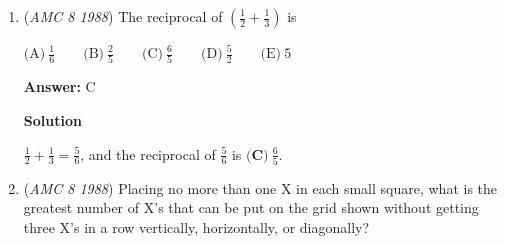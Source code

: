 \begin{enumerate}
 
 \[\begin{array}{|c|c|c|} \multicolumn{3}{}{} \\ \hline \diamondsuit & \Delta & \diamondsuit + \Delta \\ \hline 36 & 1 & 37 \\ \hline 18 & 2 & 20 \\ \hline 12 & 3 & 15 \\ \hline 9 & 4 & 13 \\ \hline 6 & 6 & 12 \\ \hline \end{array}\]

 So $\boxed{\textbf{(E)}\ 37}$ is the largest possible sum.

 



\textbf{Solution 2}

We notice that the function $f(x) = x + \frac{36}x$ is convex with a minimum at $x = 6$, so we seek to pick a value of $x$ far from 6. To ensure that the answers are positive integers, we let $x = 36$, from which we find that $f(x) = 37$, the maximum.

 -GaloisTorrent

 



\textbf{Solution 3 (Answer Choices)}

Notice that $1 \times 36 = 36$ and $1+36=37$.  Since $\boxed{\textbf{(E)}\ 37}$ is the highest answer choice it must be correct.

 


	\item (\textit{AMC 8 1988}) The reciprocal of $\left( \frac{1}{2}+\frac{1}{3}\right)$ is 


 $\text{(A)}\ \frac{1}{6} \qquad \text{(B)}\ \frac{2}{5} \qquad \text{(C)}\ \frac{6}{5} \qquad \text{(D)}\ \frac{5}{2} \qquad \text{(E)}\ 5$

 \textbf{Answer: }C



\textbf{Solution}

$\frac{1}{2} + \frac{1}{3} = \frac{5}{6}$, and the reciprocal of $\frac{5}{6}$ is $\boxed{\textbf{(C)}\ \frac{6}{5}}$.

 


	\item (\textit{AMC 8 1988}) Placing no more than one $\text{X}$ in each small square, what is the greatest number of $\text{X}$'s that can be put on the grid shown without getting three $\text{X}$'s in a row vertically, horizontally, or diagonally?



\end{enumerate}

